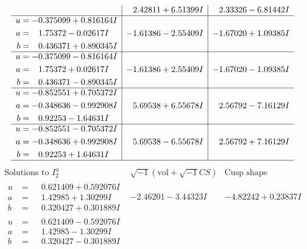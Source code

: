 \documentclass[1p]{elsarticle_modified}
\theoremstyle{definition}
\newcommand{\I}{\sqrt{-1}}
\begin{document}
$$\begin{array}{c|c|c}
 & \phantom{-}2.42811 + 6.51399 I & \phantom{-}2.33326 - 6.81442 I \\ \hline\begin{aligned}
u &= -0.375099 + 0.816164 I \\
a &= \phantom{-}1.75372 - 0.02617 I \\
b &= \phantom{-}0.436371 + 0.890345 I\end{aligned}
 & -1.61386 - 2.55409 I & -1.67020 + 1.09385 I \\ \hline\begin{aligned}
u &= -0.375099 - 0.816164 I \\
a &= \phantom{-}1.75372 + 0.02617 I \\
b &= \phantom{-}0.436371 - 0.890345 I\end{aligned}
 & -1.61386 + 2.55409 I & -1.67020 - 1.09385 I \\ \hline\begin{aligned}
u &= -0.852551 + 0.705372 I \\
a &= -0.348636 - 0.992908 I \\
b &= \phantom{-}0.92253 - 1.64631 I\end{aligned}
 & \phantom{-}5.69538 + 6.55678 I & \phantom{-}2.56792 - 7.16129 I \\ \hline\begin{aligned}
u &= -0.852551 - 0.705372 I \\
a &= -0.348636 + 0.992908 I \\
b &= \phantom{-}0.92253 + 1.64631 I\end{aligned}
 & \phantom{-}5.69538 - 6.55678 I & \phantom{-}2.56792 + 7.16129 I\\
 \hline 
 \end{array}$$\newpage$$\begin{array}{c|c|c}  
\text{Solutions to }I^u_{2}& \I (\text{vol} + \sqrt{-1}CS) & \text{Cusp shape}\\
 \hline 
\begin{aligned}
u &= \phantom{-}0.621409 + 0.592076 I \\
a &= \phantom{-}1.42985 + 1.30299 I \\
b &= \phantom{-}0.320427 + 0.301889 I\end{aligned}
 & -2.46201 - 3.44323 I & -4.82242 + 0.23837 I \\ \hline\begin{aligned}
u &= \phantom{-}0.621409 - 0.592076 I \\
a &= \phantom{-}1.42985 - 1.30299 I \\
b &= \phantom{-}0.320427 - 0.301889 I\end{aligned}

\end{array}$$
\end{document}

